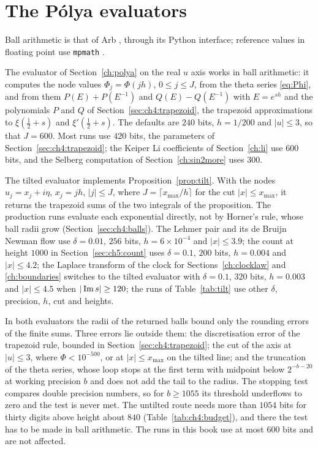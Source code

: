 \section{The P\'olya evaluators}\label{app:code}

Ball arithmetic is that of Arb \cite{Arb}, through its Python interface; reference values in floating point use \texttt{mpmath} \cite{mpmath}.
\label{app:code:eval}

The evaluator of Section~\ref{ch:polya} on the real $u$ axis works in ball arithmetic: it computes the node values $\Phi_j=\Phi(jh)$, $0\le j\le J$, from the theta series \eqref{eq:Phi}, and from them $P(E)+P(E^{-1})$ and $Q(E)-Q(E^{-1})$ with $E=e^{sh}$ and the polynomials $P$ and $Q$ of Section~\ref{sec:ch4:trapezoid}, the trapezoid approximations to $\xi(\frac12+s)$ and $\xi'(\frac12+s)$. The defaults are $240$ bits, $h=1/200$ and $|u|\le3$, so that $J=600$. Most runs use $420$ bits, the parameters of Section~\ref{sec:ch4:trapezoid}; the Keiper Li coefficients of Section~\ref{ch:li} use $600$ bits, and the Selberg computation of Section~\ref{ch:sin2more} uses $300$.

The tilted evaluator implements Proposition~\ref{prop:tilt}. With the nodes $u_j=x_j+i\eta$, $x_j=jh$, $|j|\le J$, where $J=\lceil x_{\max}/h\rceil$ for the cut $|x|\le x_{\max}$, it returns the trapezoid sums of the two integrals of the proposition. The production runs evaluate each exponential directly, not by Horner's rule, whose ball radii grow (Section~\ref{sec:ch4:balls}). The Lehmer pair and its de Bruijn Newman flow use $\delta=0.01$, $256$ bits, $h=6\times10^{-4}$ and $|x|\le3.9$; the count at height $1000$ in Section~\ref{sec:ch5:count} uses $\delta=0.1$, $200$ bits, $h=0.004$ and $|x|\le4.2$; the Laplace transform of the clock for Sections~\ref{ch:clocklaw} and \ref{ch:boundaries} switches to the tilted evaluator with $\delta=0.1$, $320$ bits, $h=0.003$ and $|x|\le4.5$ when $|\operatorname{Im} s|\ge120$; the runs of Table~\ref{tab:tilt} use other $\delta$, precision, $h$, cut and heights.

In both evaluators the radii of the returned balls bound only the rounding errors of the finite sums. Three errors lie outside them: the discretisation error of the trapezoid rule, bounded in Section~\ref{sec:ch4:trapezoid}; the cut of the axis at $|u|\le3$, where $\Phi<10^{-500}$, or at $|x|\le x_{\max}$ on the tilted line; and the truncation of the theta series, whose loop stops at the first term with midpoint below $2^{-b-20}$ at working precision $b$ and does not add the tail to the radius. The stopping test compares double precision numbers, so for $b\ge1055$ its threshold underflows to zero and the test is never met. The untilted route needs more than $1054$ bits for thirty digits above height about $840$ (Table~\ref{tab:ch4:budget}), and there the test has to be made in ball arithmetic. The runs in this book use at most $600$ bits and are not affected.
